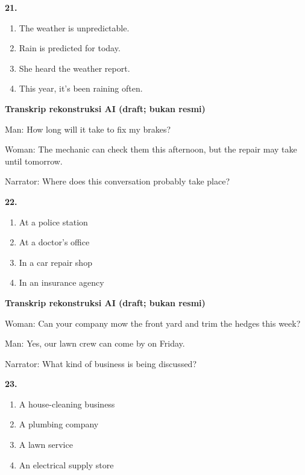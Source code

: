 \documentclass[12pt]{article}
\begin{document}
\noindent\textbf{21.}
\begin{enumerate}[label=(\Alph*),leftmargin=*,itemsep=0.2em]
\item The weather is unpredictable.
\item Rain is predicted for today.
\item She heard the weather report.
\item This year, it's been raining often.
\end{enumerate}
\par
\vspace{0.25\baselineskip}
\begin{exampleblock}
\textbf{Transkrip rekonstruksi AI (draft; bukan resmi)}\par
Man: How long will it take to fix my brakes?\par
Woman: The mechanic can check them this afternoon, but the repair may take until tomorrow.\par
Narrator: Where does this conversation probably take place?\par
\end{exampleblock}
\noindent\textbf{22.}
\begin{enumerate}[label=(\Alph*),leftmargin=*,itemsep=0.2em]
\item At a police station
\item At a doctor's office
\item In a car repair shop
\item In an insurance agency
\end{enumerate}
\par
\vspace{0.25\baselineskip}
\begin{exampleblock}
\textbf{Transkrip rekonstruksi AI (draft; bukan resmi)}\par
Woman: Can your company mow the front yard and trim the hedges this week?\par
Man: Yes, our lawn crew can come by on Friday.\par
Narrator: What kind of business is being discussed?\par
\end{exampleblock}
\noindent\textbf{23.}
\begin{enumerate}[label=(\Alph*),leftmargin=*,itemsep=0.2em]
\item A house-cleaning business
\item A plumbing company
\item A lawn service
\item An electrical supply store
\end{enumerate}
\end{document}
